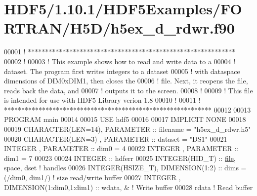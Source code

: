 \hypertarget{_h_d_f5_21_810_81_2_h_d_f5_examples_2_f_o_r_t_r_a_n_2_h5_d_2h5ex__d__rdwr_8f90_source}{}\section{H\+D\+F5/1.10.1/\+H\+D\+F5\+Examples/\+F\+O\+R\+T\+R\+A\+N/\+H5\+D/h5ex\+\_\+d\+\_\+rdwr.f90}
\label{_h_d_f5_21_810_81_2_h_d_f5_examples_2_f_o_r_t_r_a_n_2_h5_d_2h5ex__d__rdwr_8f90_source}

\begin{DoxyCode}
00001 \textcolor{comment}{! ************************************************************}
00002 \textcolor{comment}{!}
00003 \textcolor{comment}{!  This example shows how to read and write data to a}
00004 \textcolor{comment}{!  dataset.  The program first writes integers to a dataset}
00005 \textcolor{comment}{!  with dataspace dimensions of DIM0xDIM1, then closes the}
00006 \textcolor{comment}{!  file.  Next, it reopens the file, reads back the data, and}
00007 \textcolor{comment}{!  outputs it to the screen.}
00008 \textcolor{comment}{!}
00009 \textcolor{comment}{!  This file is intended for use with HDF5 Library verion 1.8}
00010 \textcolor{comment}{!}
00011 \textcolor{comment}{! ************************************************************}
00012 
00013 \textcolor{keyword}{PROGRAM} main
00014 
00015   \textcolor{keywordtype}{USE }hdf5
00016 
00017   \textcolor{keywordtype}{IMPLICIT NONE}
00018 
00019   \textcolor{keywordtype}{CHARACTER(LEN=14)}, \textcolor{keywordtype}{PARAMETER} :: filename = \textcolor{stringliteral}{"h5ex\_d\_rdwr.h5"}
00020   \textcolor{keywordtype}{CHARACTER(LEN=3)} , \textcolor{keywordtype}{PARAMETER} :: dataset = \textcolor{stringliteral}{"DS1"}
00021   \textcolor{keywordtype}{INTEGER}          , \textcolor{keywordtype}{PARAMETER} :: dim0     = 4
00022   \textcolor{keywordtype}{INTEGER}          , \textcolor{keywordtype}{PARAMETER} :: dim1     = 7
00023 
00024   \textcolor{keywordtype}{INTEGER} :: hdferr
00025   \textcolor{keywordtype}{INTEGER(HID\_T)} :: \hyperlink{structfile}{file}, space, dset \textcolor{comment}{! handles}
00026   \textcolor{keywordtype}{INTEGER(HSIZE\_T)}, \textcolor{keywordtype}{DIMENSION(1:2)}           :: dims = (/dim0, dim1/) \textcolor{comment}{! size read/write buffer}
00027   \textcolor{keywordtype}{INTEGER}         , \textcolor{keywordtype}{DIMENSION(1:dim0,1:dim1)} :: wdata, &  \textcolor{comment}{! Write buffer }
00028                                                 rdata     \textcolor{comment}{! Read buffer}

\end{DoxyCode}
